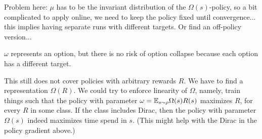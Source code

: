\documentclass[11pt,a4paper]{article}
\begin{document}
Problem here: $\mu$ has to be the invariant distribution of the
$\Omega(s)$-policy, so a bit complicated to apply online, we need to keep
the policy fixed until convergence... this implies having separate runs
with different targets. Or find an off-policy version... 

$\omega$ represents an option, but there is no risk of option collapse
because each option has a different target.

This still does not cover policies with arbitrary rewards $R$. We have to
find a representation $\Omega(R)$. We could try to enforce linearity of
$\Omega$, namely, train things such that the policy with parameter
$\omega=\mathbb{E}_{s\sim \rho} \Omega(s)R(s)$ maximizes $R$, for every $R$ in some
class. If the class includes Dirac, then 
the policy with parameter
$\Omega(s)$ indeed maximizes time spend in $s$. (This might help with the
Dirac in the policy gradient above.)
\end{document}
